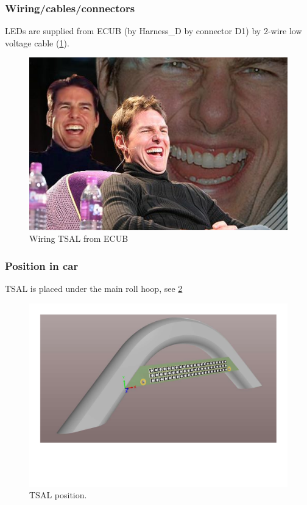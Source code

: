 \subsubsection{Wiring/cables/connectors}

LEDs are supplied from ECUB (by Harness\_D by connector D1) by 2-wire low voltage cable (\ref{fig:TSAL-wiring}).

\begin{figure}[H]
	\centering
	\includegraphics[width=\textwidth,]{./img/tsal-wiring.jpg}
	\caption{Wiring TSAL from ECUB}
	\label{fig:TSAL-wiring}
\end{figure}

\subsubsection{Position in car}
TSAL is placed under the main roll hoop, see \ref{fig:TSAL-position}

\begin{figure}[H]
	\centering
	\includegraphics[width=\textwidth,trim={3cm 11cm 2cm 1cm},clip]{./img/tsal-position.pdf}
	\caption{TSAL position.}
	\label{fig:TSAL-position}
\end{figure}